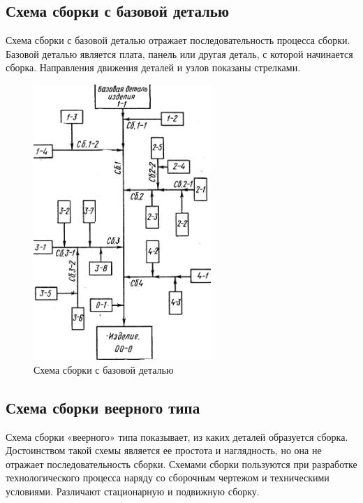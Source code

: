 \documentclass[unicode, 12pt, a4paper, oneside]{article}
\begin{document}
\subsection*{Схема сборки с базовой деталью}

Схема сборки с базовой деталью отражает последовательность процесса сборки. Базовой деталью является плата, панель или другая деталь, с которой начинается сборка. Направления движения деталей и узлов показаны стрелками.

\begin{figure}[htbp]
\centering
\includegraphics[width=0.6\textwidth]{95_scheme_with_base_component.png}
\caption{Схема сборки с базовой деталью}
\label{fig:95_scheme_with_base_component}
\end{figure}

\subsection*{Схема сборки веерного типа}

Схема сборки «веерного» типа показывает, из каких деталей образуется сборка. Достоинством такой схемы является ее простота и наглядность, но она не отражает последовательность сборки.
Схемами сборки пользуются при разработке технологического процесса наряду со сборочным чертежом и техническими условиями.
Различают стационарную и подвижную сборку.
\end{document}
